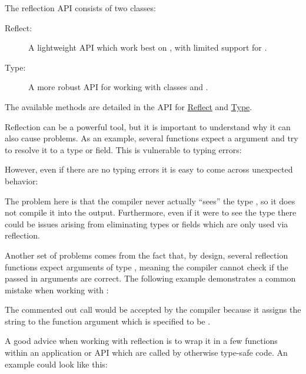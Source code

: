 The reflection API consists of two classes:

\begin{description}
	\item[Reflect:] A lightweight API which work best on , with limited support for . 
	\item[Type:] A more robust API for working with classes and .
\end{description}

The available methods are detailed in the API for \href{http://api.haxe.org//Reflect.html}{Reflect} and \href{http://api.haxe.org//Type.html}{Type}.

Reflection can be a powerful tool, but it is important to understand why it can also cause problems. As an example, several functions expect a  argument and try to resolve it to a type or field. This is vulnerable to typing errors:


However, even if there are no typing errors it is easy to come across unexpected behavior:


The problem here is that the compiler never actually ``sees'' the type , so it does not compile it into the output. Furthermore, even if it were to see the type there could be issues arising from  eliminating types or fields which are only used via reflection.

Another set of problems comes from the fact that, by design, several reflection functions expect arguments of type , meaning the compiler cannot check if the passed in arguments are correct. The following example demonstrates a common mistake when working with :


The commented out call would be accepted by the compiler because it assigns the string  to the function argument  which is specified to be .

A good advice when working with reflection is to wrap it in a few functions within an application or API which are called by otherwise type-safe code. An example could look like this:


